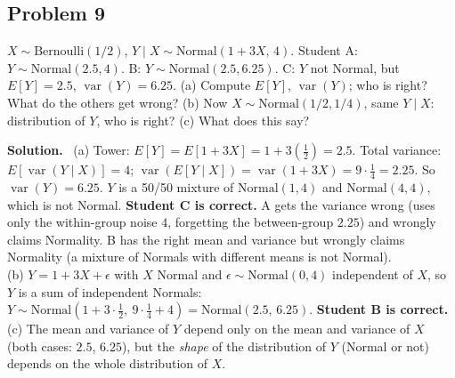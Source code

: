 \documentclass[11pt]{article}
\newcommand{\Bern}{\text{Bernoulli}}
\newcommand{\Norm}{\text{Normal}}
\newenvironment{soln}{\par\smallskip\noindent\textbf{Solution.}\ }{\par\medskip}
\begin{document}
\subsection*{Problem 9}
$X\sim\Bern(1/2)$, $Y\mid X\sim\Norm(1+3X,\,4)$. Student A: $Y\sim\Norm(2.5,4)$. B: $Y\sim\Norm(2.5,6.25)$. C: $Y$ not Normal, but $E[Y]=2.5$, $\operatorname{var}(Y)=6.25$.
(a) Compute $E[Y]$, $\operatorname{var}(Y)$; who is right? What do the others get wrong? (b) Now $X\sim\Norm(1/2,1/4)$, same $Y\mid X$: distribution of $Y$, who is right? (c) What does this say?
\begin{soln}
(a) Tower: $E[Y]=E[1+3X]=1+3(\frac12)=2.5$. Total variance: $E[\operatorname{var}(Y\mid X)]=4$; $\operatorname{var}(E[Y\mid X])=\operatorname{var}(1+3X)=9\cdot\frac14=2.25$. So $\operatorname{var}(Y)=6.25$.
$Y$ is a 50/50 mixture of $\Norm(1,4)$ and $\Norm(4,4)$, which is not Normal. \textbf{Student C is correct.}
A gets the variance wrong (uses only the within-group noise $4$, forgetting the between-group $2.25$) and wrongly claims Normality.
B has the right mean and variance but wrongly claims Normality (a mixture of Normals with different means is not Normal).\\
(b) $Y=1+3X+\epsilon$ with $X$ Normal and $\epsilon\sim\Norm(0,4)$ independent of $X$, so $Y$ is a sum of independent Normals: $Y\sim\Norm(1+3\cdot\frac12,\ 9\cdot\frac14+4)=\Norm(2.5,\,6.25)$. \textbf{Student B is correct.}\\
(c) The mean and variance of $Y$ depend only on the mean and variance of $X$ (both cases: $2.5$, $6.25$), but the \emph{shape} of the distribution of $Y$ (Normal or not) depends on the whole distribution of $X$.
\end{soln}

\end{document}
